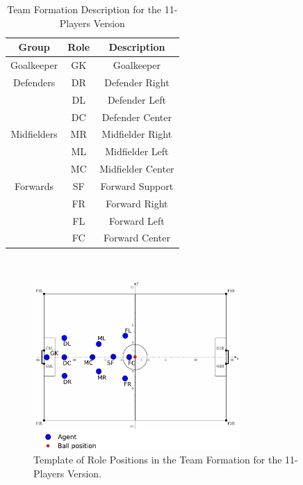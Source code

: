 \begin{table}[t!]
\vspace*{-0.5cm}
\caption{Team Formation Description for the 11-Players Version}
\label{TeamFormation11}
\begin{center}
    \begin{tabular}{ccc}
    \textbf{Group} 	& \textbf{Role} & \textbf{Description}  \\
    \midrule
	Goalkeeper 		     & GK		& Goalkeeper  \\ 
    Defenders			& DR		& Defender Right			\\
     						& DL		& Defender Left		 	\\
    						& DC		& Defender Center			\\
    Midfielders			    & MR		& Midfielder Right			\\
     						& ML		& Midfielder Left			\\
     						& MC		& Midfielder Center			\\
    Forwards 	  	  	& SF		& Forward Support         \\
     						& FR		& Forward Right		 	\\
     					& FL		& Forward Left		 	\\
     					& FC   	    & Forward Center		 
    \end{tabular}
\end{center}
\vspace*{-0.9cm}
\end{table}
~
\begin{figure}[b!]
\centering
  \includegraphics[width=0.7\textwidth]{Chapter4/figures/Formation11_0.pdf}
  \caption{Template of Role Positions in the Team Formation for the 11-Players Version.} 
  \label{fig:Formation11_0}
\end{figure}

